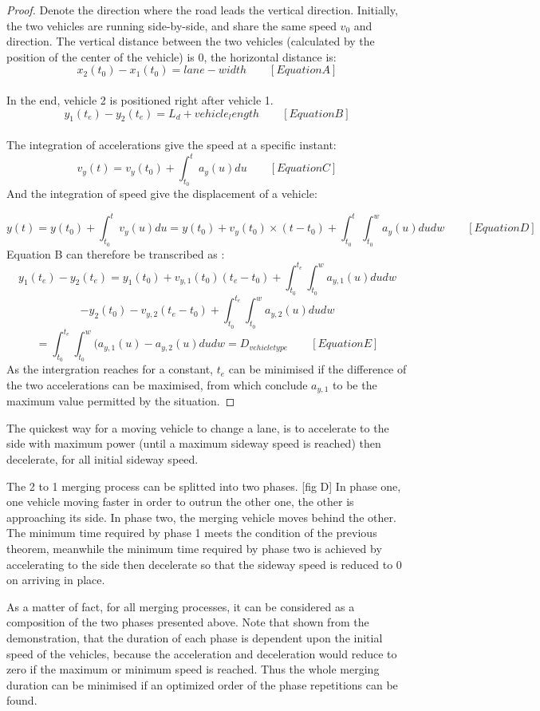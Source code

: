 \documentclass{mcmthesis}
\begin{document}
\begin{proof}
Denote the direction where the road leads the vertical direction.
Initially, the two vehicles are running side-by-side, and share the same speed $v_0$ and direction.
The vertical distance between the two vehicles (calculated by the position of the center of the vehicle) is 0, the horizontal distance is: $$x_2(t_0)-x_1(t_0)=lane-width \qquad [Equation A]$$\\
In the end, vehicle 2 is positioned right after vehicle 1.
$$y_1(t_e)-y_2(t_e)=L_d+vehicle_length \qquad [Equation B]$$\\
The integration of accelerations give the speed at a specific instant:
 $$v_y(t)=v_y(t_0)+ \int_{t_0}^{t}a_y(u)du \qquad [Equation C]$$
And the integration of speed give the displacement of a vehicle:

$$y(t)=y(t_0)+ \int_{t_0}^{t}v_y(u)du=y(t_0)+v_y(t_0) \times (t-t_0)+ \int_{t_0}^{t}\int_{t_0}^{w}a_y(u)dudw \qquad [Equation D]$$
Equation B can therefore be transcribed as :
$$y_1(t_e)-y_2(t_e)=y_1(t_0)+v_{y,1}(t_0)(t_e-t_0)+\int_{t_0}^{t_e}\int_{t_0}^{w}a_{y,1}(u)dudw$$
$$-y_2(t_0)-v_{y,2}(t_e-t_0)+\int_{t_0}^{t_e}\int_{t_0}^{w}a_{y,2}(u)dudw$$
$$ =\int_{t_0}^{t_e}\int_{t_0}^{w}(a_{y,1}(u)-a_{y,2}(u)dudw=D_{vehicle type}\qquad [Equation E]$$
As the intergration reaches for a constant, $t_e$ can be minimised if the difference of the two accelerations can be maximised, from which conclude $a_{y,1}$ to be the maximum value permitted by the situation.

\end{proof}

\begin{Theorem} \label{thm:yingsongsheng3}
The quickest way for a moving vehicle to change a lane, is to accelerate to the side with maximum power (until a maximum sideway speed is reached) then decelerate, for all initial sideway speed.
\end{Theorem}

The 2 to 1 merging process can be splitted into two phases. [fig D] In phase one, one vehicle moving faster in order to outrun the other one, the other is approaching its side. In phase two, the merging vehicle moves behind the other. The minimum time required by phase 1 meets the condition of the previous theorem, meanwhile the minimum time required by phase two is achieved by accelerating to the side then decelerate so that the sideway speed is reduced to 0 on arriving in place.


As a matter of fact, for all merging processes, it can be considered as a composition of the two phases presented above. Note that shown from the demonstration, that the duration of each phase is dependent upon the initial speed of the vehicles, because the acceleration and deceleration would reduce to zero if the maximum or minimum speed is reached. Thus the whole merging duration can be minimised if an optimized order of the phase repetitions can be found.
\end{document}
